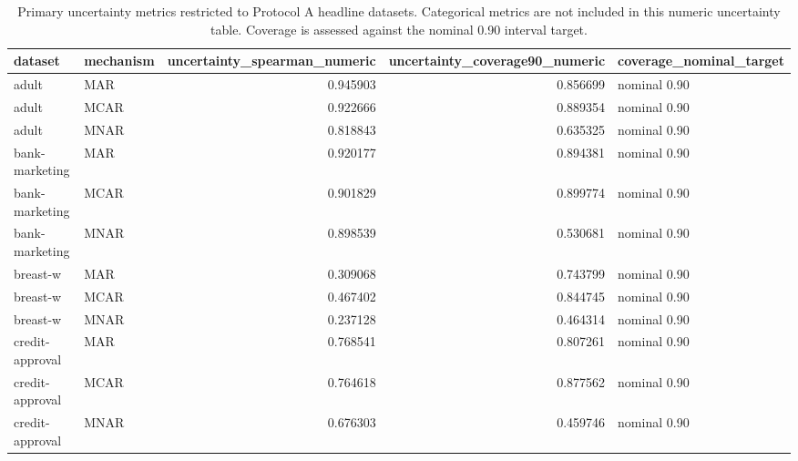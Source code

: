 \begin{table}[ht]
\centering
\caption{Primary uncertainty metrics restricted to Protocol A headline datasets. Categorical metrics are not included in this numeric uncertainty table. Coverage is assessed against the nominal 0.90 interval target.}
\label{tab:protocol_a_project_mice_uncertainty}
\begin{tabular}{llrrl}
\hline
 dataset              & mechanism   &   uncertainty\_spearman\_numeric &   uncertainty\_coverage90\_numeric & coverage\_nominal\_target   \\
\hline
 adult                & MAR         &                       0.945903 &                         0.856699 & nominal 0.90              \\
 adult                & MCAR        &                       0.922666 &                         0.889354 & nominal 0.90              \\
 adult                & MNAR        &                       0.818843 &                         0.635325 & nominal 0.90              \\
 bank-marketing       & MAR         &                       0.920177 &                         0.894381 & nominal 0.90              \\
 bank-marketing       & MCAR        &                       0.901829 &                         0.899774 & nominal 0.90              \\
 bank-marketing       & MNAR        &                       0.898539 &                         0.530681 & nominal 0.90              \\
 breast-w             & MAR         &                       0.309068 &                         0.743799 & nominal 0.90              \\
 breast-w             & MCAR        &                       0.467402 &                         0.844745 & nominal 0.90              \\
 breast-w             & MNAR        &                       0.237128 &                         0.464314 & nominal 0.90              \\
 credit-approval      & MAR         &                       0.768541 &                         0.807261 & nominal 0.90              \\
 credit-approval      & MCAR        &                       0.764618 &                         0.877562 & nominal 0.90              \\
 credit-approval      & MNAR        &                       0.676303 &                         0.459746 & nominal 0.90              \\

\end{tabular}
\end{table}

